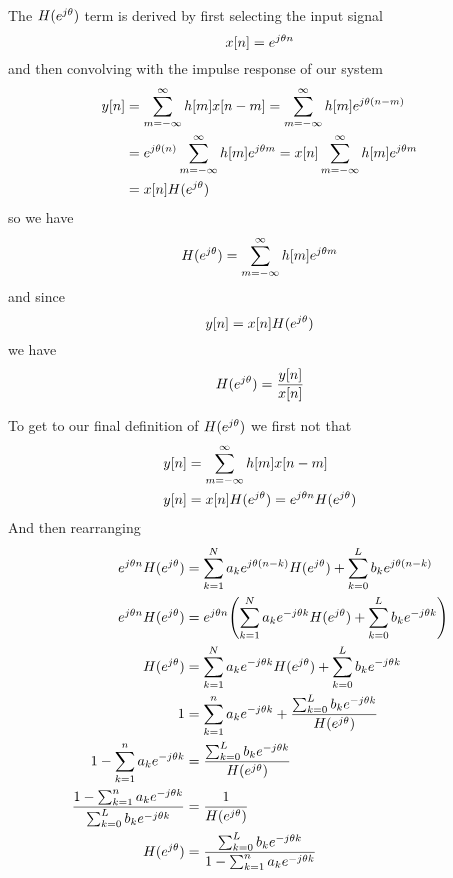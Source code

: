 \documentclass[11pt]{article}
\let\originalleft\left
\let\originalright\right
\renewcommand{\left}{\mathopen{}\mathclose\bgroup\originalleft}
\renewcommand{\right}{\aftergroup\egroup\originalright}
\def\lsqb{\left[}
\def\rsqb{\right]}
\def\sqb#1{\lsqb #1 \rsqb}
\def\xsig{x\sqb{n}}
\def\ysig{y\sqb{n}}
\begin{document}
The $H(e^{j\theta})$ term is derived by first selecting the input signal
\begin{equation}
    \xsig = e^{j\theta n}
\end{equation}
and then convolving with the impulse response of our system
\def\convsum{\sum_{m=-\infty}^{\infty}}
\begin{align}
    \ysig &= \convsum h\sqb{m} x\sqb{n-m} = \convsum h\sqb{m} e^{j\theta(n-m)} \\
          &= e^{j\theta(n)} \convsum h\sqb{m} e^{j\theta m} = \xsig \convsum h\sqb{m} e^{j\theta m} \\
          &= \xsig \hfun
\end{align}
so we have
\begin{equation}
    \hfun = \convsum h\sqb{m} e^{j\theta m}
\end{equation}
and since
\begin{equation}
    \ysig = \xsig \hfun
\end{equation}
we have
\begin{equation}
    \hfun = \frac{\ysig}{\xsig}
\end{equation}

To get to our final definition of $H(e^{j\theta})$ we first not that
\begin{align}
    \ysig &= \convsum h\sqb{m} x\sqb{n-m} \\
    \ysig &= \xsig \hfun = e^{j\theta n} \hfun
\end{align}
And then rearranging
\begin{align}
    e^{j\theta n} \hfun &= \sum_{k=1}^{N} a_k e^{j\theta (n-k)} \hfun + \sum_{k=0}^{L} b_k e^{j\theta(n-k)} \\
    e^{j\theta n} \hfun &= e^{j\theta n} \left( \sum_{k=1}^{N} a_k e^{-j\theta k} \hfun + \sum_{k=0}^{L} b_k e^{-j\theta k} \right)\\
    \hfun &= \sum_{k=1}^{N} a_k e^{-j\theta k} \hfun + \sum_{k=0}^{L} b_k e^{-j\theta k} \\
    1 &= \sum_{k=1}^{n} a_k e^{-j\theta k} + \frac{\sum_{k=0}^{L} b_k e^{-j\theta k}}{\hfun} \\
    1 - \sum_{k=1}^{n} a_k e^{-j\theta k} &= \frac{\sum_{k=0}^{L} b_k e^{-j\theta k}}{\hfun} \\
    \frac{1 - \sum_{k=1}^{n} a_k e^{-j\theta k}}{\sum_{k=0}^{L} b_k e^{-j\theta k}} &= \frac{1}{\hfun}\\
    \hfun &= \frac{\sum_{k=0}^{L} b_k e^{-j\theta k}}{1 - \sum_{k=1}^{n} a_k e^{-j\theta k}} \label{eq:frequency_response}
\end{align}
\end{document}
